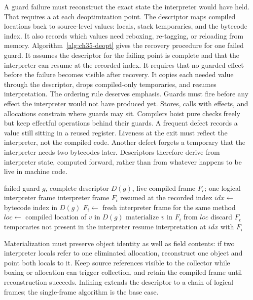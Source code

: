 A guard failure must reconstruct the exact state the interpreter would have held.
That requires a  at each deoptimization point.
The descriptor maps compiled locations back to source-level values: locals, stack temporaries, and the bytecode index.
It also records which values need reboxing, re-tagging, or reloading from memory.
Algorithm~\ref{alg:ch35-deopt} gives the recovery procedure for one failed guard.
It assumes the descriptor for the failing point is complete and that the interpreter can resume at the recorded index.
It requires that no guarded effect before the failure becomes visible after recovery.
It copies each needed value through the descriptor, drops compiled-only temporaries, and resumes interpretation.
The ordering rule deserves emphasis.
Guards must fire before any effect the interpreter would not have produced yet.
Stores, calls with effects, and allocations constrain where guards may sit.
Compilers hoist pure checks freely but keep effectful operations behind their guards.
A frequent defect records a value still sitting in a reused register.
Liveness at the exit must reflect the interpreter, not the compiled code.
Another defect forgets a temporary that the interpreter needs two bytecodes later.
Descriptors therefore derive from interpreter state, computed forward, rather than from whatever happens to be live in machine code.

\begin{algorithm}[htbp]
\caption{Deoptimization after a failed guard}\label{alg:ch35-deopt}
\begin{pseudocode}
\Require failed guard $g$, complete descriptor $D(g)$, live compiled frame $F_c$; one logical interpreter frame
\Ensure interpreter frame $F_i$ resumed at the recorded index
\State $idx \gets$ bytecode index in $D(g)$
\State $F_i \gets$ fresh interpreter frame for the same method
\State $loc \gets$ compiled location of $v$ in $D(g)$
\State materialize $v$ in $F_i$ from $loc$ 
\EndFor
\State discard $F_c$ temporaries not present in the interpreter
\State resume interpretation at $idx$ with $F_i$
\end{pseudocode}
\end{algorithm}

Materialization must preserve object identity as well as field contents: if two interpreter locals refer to one eliminated allocation, reconstruct one object and point both locals to it.
Keep source references visible to the collector while boxing or allocation can trigger collection, and retain the compiled frame until reconstruction succeeds.
Inlining extends the descriptor to a chain of logical frames; the single-frame algorithm is the base case.

